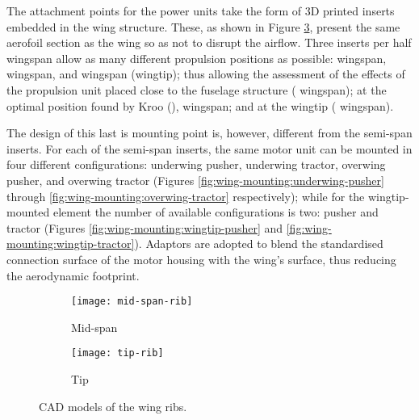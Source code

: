 \documentclass[../../main.tex]{subfiles}
\begin{document}
The attachment points for the power units take the form of 3D printed inserts embedded in the wing structure.
These, as shown in Figure \ref{fig:ribs}, present the same aerofoil section as the wing so as not to disrupt the airflow.
Three inserts per half wingspan allow as many different propulsion positions as possible:  wingspan,  wingspan, and  wingspan (wingtip); thus allowing the assessment of the effects of the propulsion unit placed close to the fuselage structure ( wingspan); at the optimal position found by Kroo (\cite{kroo-86}),  wingspan; and at the wingtip ( wingspan).

The design of this last is mounting point is, however, different from the semi-span inserts.
For each of the semi-span inserts, the same motor unit can be mounted in four different configurations: underwing pusher, underwing tractor, overwing pusher, and overwing tractor (Figures \ref{fig:wing-mounting:underwing-pusher} through \ref{fig:wing-mounting:overwing-tractor} respectively); while for the wingtip-mounted element the number of available configurations is two: pusher and tractor (Figures \ref{fig:wing-mounting:wingtip-pusher} and \ref{fig:wing-mounting:wingtip-tractor}).
Adaptors are adopted to blend the standardised connection surface of the motor housing with the wing's surface, thus reducing the aerodynamic footprint. 


\begin{figure}[H]
    \centering
    \begin{subfigure}[b]{0.49\columnwidth}
        \centering
        \texttt{[image: mid-span-rib]}
        \caption{Mid-span}
        \label{fig:ribs:mid-span}
    \end{subfigure}
    \hfill
    \begin{subfigure}[b]{0.49\columnwidth}
        \centering
        \texttt{[image: tip-rib]}
        \caption{Tip}
        \label{fig:ribs:tip}
    \end{subfigure}
    
    \caption{CAD models of the wing ribs.}
    \label{fig:ribs}
\end{figure}

\end{document}
